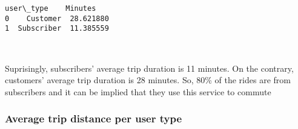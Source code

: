 \documentclass[11pt]{article}
\begin{document}
    \begin{Verbatim}[commandchars=\\\{\}]
    user\_type    Minutes
0    Customer  28.621880
1  Subscriber  11.385559

    \end{Verbatim}

    \begin{center}
    \end{center}
    { \hspace*{\fill} \\}
    
    Suprisingly, subscribers' average trip duration is 11 minutes. On the
contrary, customers' average trip duration is 28 minutes. So, 80\% of
the rides are from subscribers and it can be implied that they use this
service to commute

    \subsubsection{Average trip distance per user
type}\label{average-trip-distance-per-user-type}
\end{document}
